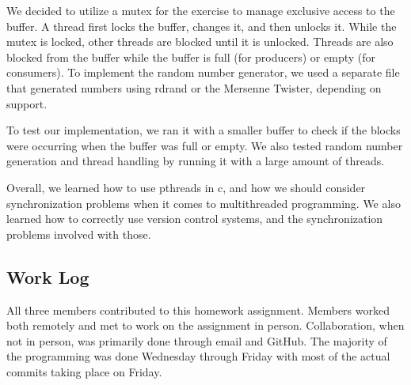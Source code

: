 \documentclass[journal, letterpaper, draftclsnofoot, onecolumn, 10pt]{IEEEtran}
\begin{document}
We decided to utilize a mutex for the exercise to manage exclusive access to the buffer. A thread first locks the buffer, changes it,
and then unlocks it. While the mutex is locked, other threads are blocked until it is unlocked. Threads are also blocked from the buffer
while the buffer is full (for producers) or empty (for consumers). To implement the random number generator, we used a separate file that
generated numbers using rdrand or the Mersenne Twister, depending on support.

To test our implementation, we ran it with a smaller buffer to check if the blocks were occurring when the buffer was full or empty.
We also tested random number generation and thread handling by running it with a large amount of threads.

Overall, we learned how to use pthreads in c, and how we should consider synchronization problems when it comes to multithreaded programming.
We also learned how to correctly use version control systems, and the synchronization problems involved with those.

\subsection{Work Log}
All three members contributed to this homework assignment.
Members worked both remotely and met to work on the assignment in person.
Collaboration, when not in person, was primarily done through email and GitHub.
The majority of the programming was done Wednesday through Friday with most of the actual commits taking place on Friday.
\end{document}

